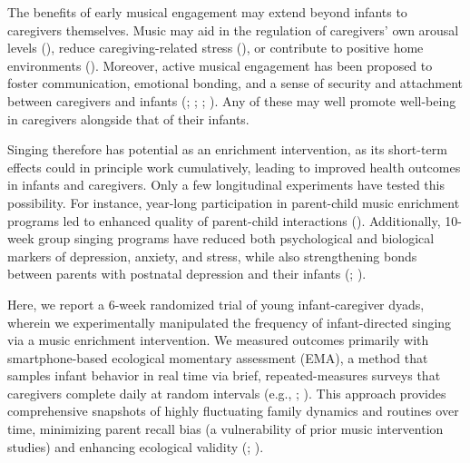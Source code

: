 \documentclass[
]{article}
\begin{document}
The benefits of early musical engagement may extend beyond infants to
caregivers themselves. Music may aid in the regulation of caregivers'
own arousal levels (),
reduce caregiving-related stress (), or contribute to positive home environments
(). Moreover, active
musical engagement has been proposed to foster communication, emotional
bonding, and a sense of security and attachment between caregivers and
infants (;
;
;
). Any of these may
well promote well-being in caregivers alongside that of their infants.

Singing therefore has potential as an enrichment intervention, as its
short-term effects could in principle work cumulatively, leading to
improved health outcomes in infants and caregivers. Only a few
longitudinal experiments have tested this possibility. For instance,
year-long participation in parent-child music enrichment programs led to
enhanced quality of parent-child interactions
(). Additionally, 10-week
group singing programs have reduced both psychological and biological
markers of depression, anxiety, and stress, while also strengthening
bonds between parents with postnatal depression and their infants
(;
).

Here, we report a 6-week randomized trial of young infant-caregiver
dyads, wherein we experimentally manipulated the frequency of
infant-directed singing via a music enrichment intervention. We measured
outcomes primarily with smartphone-based ecological momentary assessment
(EMA), a method that samples infant behavior in real time via brief,
repeated-measures surveys that caregivers complete daily at random
intervals (e.g., ;
). This approach provides
comprehensive snapshots of highly fluctuating family dynamics and
routines over time, minimizing parent recall bias (a vulnerability of
prior music intervention studies) and enhancing ecological validity
(;
).
\end{document}
